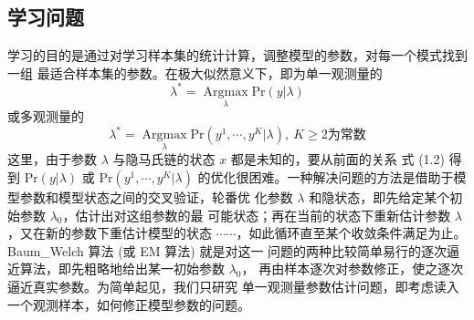 \subsection{学习问题}
学习的目的是通过对学习样本集的统计计算，调整模型的参数，对每一个模式找到一组
最适合样本集的参数。在极大似然意义下，即为单一观测量的
 $$
\lambda^{\ast}=\mathop{\mbox{Argmax}}\limits_{\lambda}\mbox{Pr}(y
|\lambda)
$$
或多观测量的
$$
  \lambda^{\ast}
  =\mathop{\mbox{Argmax}}\limits_{\lambda}\mbox{Pr}(y^{1},\cdots,y^{K} |\lambda),
    \ K\geq 2\mbox{为常数}
$$
这里，由于参数 $\lambda$ 与隐马氏链的状态 $x$
都是未知的，要从前面的关系 式 (1.2) 得到 $\mbox{Pr}(y |\lambda)$ 或
$\mbox{Pr}(y^1, \cdots, y^{K} | \lambda)$
 的优化很困难。一种解决问题的方法是借助于模型参数和模型状态之间的交叉验证，轮番优
化参数 $\lambda$ 和隐状态，即先给定某个初始参数
$\lambda_{0}$，估计出对这组参数的最
可能状态；再在当前的状态下重新估计参数
$\lambda$，又在新的参数下重估计模型的状态
$\cdots\cdots$，如此循环直至某个收敛条件满足为止。 Baum\_Welch  算法
(或 EM 算法) 就是对这一
问题的两种比较简单易行的逐次逼近算法，即先粗略地给出某一初始参数
$\lambda_{0}$，
再由样本逐次对参数修正，使之逐次逼近真实参数。为简单起见，我们只研究
单一观测量参数估计问题，即考虑读入一个观测样本，如何修正模型参数的问题。

